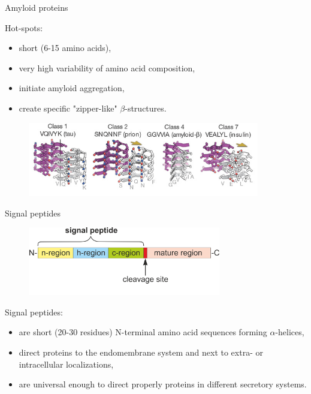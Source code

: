 \documentclass{beamer}\usepackage[]{graphicx}\usepackage[]{color}
\begin{document}
  
\begin{frame}{Amyloid proteins}

Hot-spots:
\begin{itemize}
\item short (6-15 amino acids),
\item very high variability of amino acid composition,
\item initiate amyloid aggregation,
\item create specific "zipper-like" $\beta$-structures.
\end{itemize}

\begin{figure} 
\includegraphics[width=0.9\textwidth]{static_figure/zipper_structure.jpg}
\end{figure}

\footnotesize\citet{sawaya_atomic_2007}
\end{frame}
  
\begin{frame}{Signal peptides}

\begin{figure} 
\includegraphics[width=0.75\textwidth]{static_figure/SP.png}
\end{figure}

Signal peptides:
        \begin{itemize}[<+->]
          \item are short (20-30 residues) N-terminal amino acid sequences forming $\alpha$-helices,
            \item direct proteins to the endomembrane system and next to extra- or intracellular localizations,
            \item are universal enough to direct properly proteins in different secretory systems.
        \end{itemize}
\end{frame}
\end{document}
